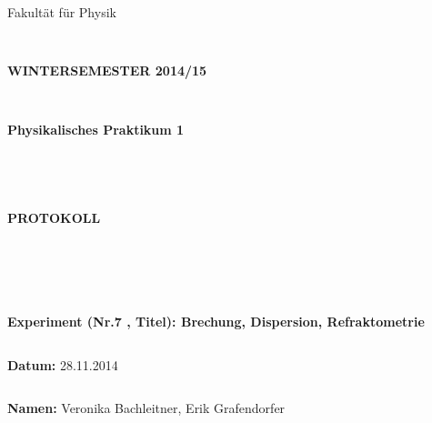 \documentclass{article}
\begin{document}
\thispagestyle{empty}
			\begin{center}
			\Large{Fakultät für Physik}\\
			\end{center}
\begin{verbatim}


\end{verbatim}
			\begin{center}
			\textbf{\LARGE WINTERSEMESTER 2014/15}
			\end{center}
\begin{verbatim}


\end{verbatim}
			\begin{center}
			\textbf{\LARGE{Physikalisches Praktikum 1}}
			\end{center}
\begin{verbatim}




\end{verbatim}

			\begin{center}
			\textbf{\LARGE{PROTOKOLL}}
			\end{center}
			
\begin{verbatim}





\end{verbatim}

			\begin{flushleft}
			\textbf{\Large{Experiment (Nr.7 , Titel):} Brechung, Dispersion, Refraktometrie}\\
			\LARGE{}	
			\end{flushleft}

\begin{verbatim}

\end{verbatim}	
			\begin{flushleft}
			\textbf{\Large{Datum:}} \Large{28.11.2014}
			\end{flushleft}
			
\begin{verbatim}
\end{verbatim}
		\begin{flushleft}
			\textbf{\Large{Namen:}} \Large{Veronika Bachleitner, Erik Grafendorfer}
			\end{flushleft}
\end{document}
